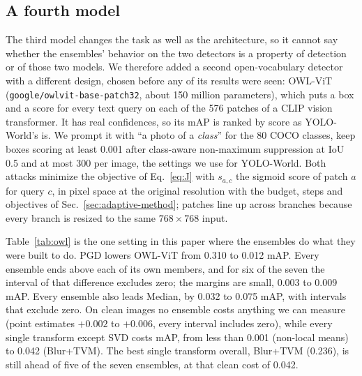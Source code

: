 \documentclass[11pt]{article}
\newcommand{\yw}{YOLO-World}
\begin{document}
\subsection{A fourth model}
\label{sec:fourth}

The third model changes the task as well as the architecture, so it cannot
say whether the ensembles' behavior on the two detectors is a property of
detection or of those two models. We therefore added a second
open-vocabulary detector with a different design, chosen before any of its
results were seen: OWL-ViT~\cite{minderer2022simple}
(\texttt{google/owlvit-base-patch32}, about 150 million parameters), which
puts a box and a score for every text query on each of the 576 patches of a
CLIP vision transformer. It has real confidences, so its mAP is ranked by
score as \yw{}'s is. We prompt it with ``a photo of a \emph{class}'' for the
80 COCO classes, keep boxes scoring at least 0.001 after class-aware
non-maximum suppression at IoU 0.5 and at most 300 per image, the settings
we use for \yw{}. Both attacks minimize the objective of Eq.~\ref{eq:J} with
$s_{a,c}$ the sigmoid score of patch $a$ for query $c$, in pixel space at
the original resolution with the budget, steps and objectives of
Sec.~\ref{sec:adaptive-method}; patches line up across branches because
every branch is resized to the same $768\times768$ input.

\begin{table}[t]
\centering\small
\caption{OWL-ViT under oblivious PGD ($\epsilon=7/255$, 50 steps), first
1{,}000 images; clean mAP 0.310, attacked 0.012. Clean cost is defended minus
undefended clean mAP; recovery is the share of the attack's damage that the
defense restores. Last column: an ensemble's attacked mAP minus that of its
best member, with a 95\% paired bootstrap interval over images (1{,}000
resamples); bold marks an interval that excludes zero. Sorted by attacked
mAP.}
\label{tab:owl}
\end{table}

Table~\ref{tab:owl} is the one setting in this paper where the ensembles do
what they were built to do. PGD lowers OWL-ViT from 0.310 to 0.012 mAP.
Every ensemble ends above each of its own members, and for six of the seven
the interval of that difference excludes zero; the margins are small, 0.003
to 0.009 mAP. Every ensemble also leads Median, by 0.032 to 0.075 mAP, with
intervals that exclude zero. On clean images no ensemble costs anything we
can measure (point estimates $+0.002$ to $+0.006$, every interval includes
zero), while every single transform except SVD costs mAP, from less than
0.001 (non-local means) to 0.042 (Blur+TVM). The best single transform overall, Blur+TVM (0.236), is still
ahead of five of the seven ensembles, at that clean cost of 0.042.
\end{document}

